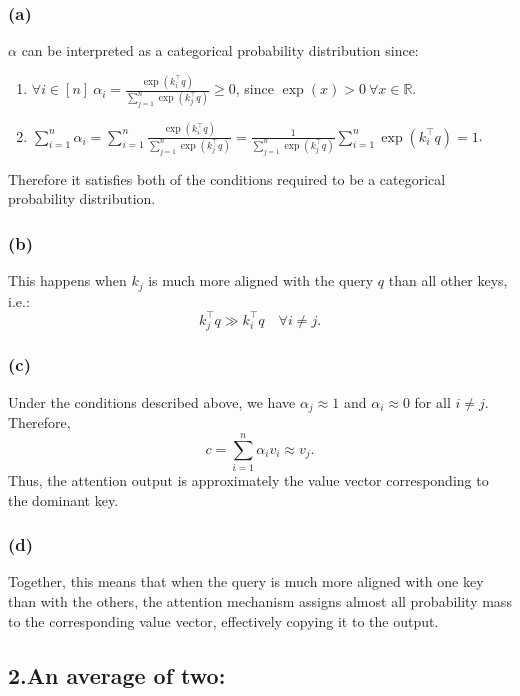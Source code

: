 \documentclass{article}
\begin{document}
\subsubsection*{(a)}
$\alpha$ can be interpreted as a categorical probability distribution since:
\begin{enumerate}
    \item $\forall i\in[n]\  \alpha_i=\frac{\exp(k_i^\top q)}{\sum_{j=1}^n\exp(k_j^\top q)}\ge0$, since $\exp(x)>0 \ \forall x\in \mathbb{R}$.
    \item $\sum_{i=1}^n\alpha_i=\sum_{i=1}^n\frac{\exp(k_i^\top q)}{\sum_{j=1}^n\exp(k_j^\top q)}=\frac{1}{\sum_{j=1}^n\exp(k_j^\top q)}\sum_{i=1}^n\exp(k_i^\top q)=1$.
\end{enumerate}
Therefore it satisfies both of the conditions required to be a categorical probability distribution.

\subsubsection*{(b)}
This happens when $k_j$ is much more aligned with the query $q$ than all other keys, i.e.:
\[
k_j^\top q \gg k_i^\top q \quad \forall i\neq j.
\]
\subsubsection*{(c)}
Under the conditions described above, we have $\alpha_j \approx 1$ and $\alpha_i \approx 0$ for all $i \neq j$. Therefore,
\[
c = \sum_{i=1}^n \alpha_i v_i \approx v_j.
\]
Thus, the attention output is approximately the value vector corresponding to the dominant key.

\subsubsection*{(d)}
Together, this means that when the query is much more aligned with one key than with the others, the attention mechanism assigns almost all probability mass to the corresponding value vector, effectively copying it to the output.

\newpage
\subsection*{2.An average of two:}
\end{document}
